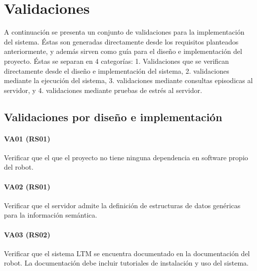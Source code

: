 

\section{Validaciones}

A continuación se presenta un conjunto de validaciones para la implementación del sistema. Éstas son generadas directamente desde los requisitos planteados anteriormente, y además sirven como guía para el diseño e implementación del proyecto. Éstas se separan en 4 categorías: 1. Validaciones que se verifican directamente desde el diseño e implementación del sistema, 2. validaciones mediante la ejecución del sistema, 3. validaciones mediante consultas episodicas al servidor, y 4. validaciones mediante pruebas de estrés al servidor.


\subsection{Validaciones por diseño e implementación}
\paragraph{VA01 (RS01)}
Verificar que el que el proyecto no tiene ninguna dependencia en software propio del robot.

\paragraph{VA02 (RS01)}
Verificar que el servidor admite la definición de estructuras de datos genéricas para la información semántica.

\paragraph{VA03 (RS02)}
Verificar que el sistema LTM se encuentra documentado en la documentación del robot. La documentación debe incluir tutoriales de instalación y uso del sistema.

